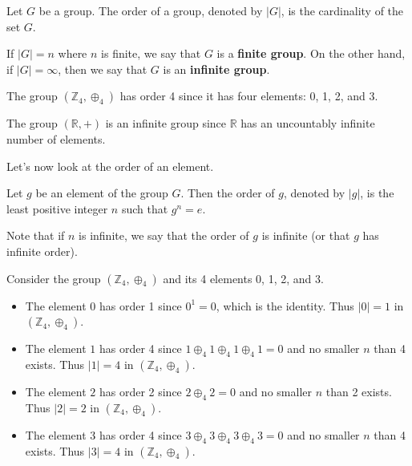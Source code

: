 \begin{definition}
    Let $G$ be a group. The order of a group, denoted by $|G|$, is the cardinality of the set $G$.
\end{definition}

If $|G| = n$ where $n$ is finite, we say that $G$ is a \textbf{finite group}. On the other hand, if $|G| = \infty$, then we say that $G$ is an \textbf{infinite group}.

\begin{example}
    The group $(\mathbb{Z}_4, \oplus_4)$ has order 4 since it has four elements: 0, 1, 2, and 3.
\end{example}

\begin{example}
    The group $(\mathbb{R}, +)$ is an infinite group since $\mathbb{R}$ has an uncountably infinite number of elements.
\end{example}

Let's now look at the order of an element.
\begin{definition}
    Let $g$ be an element of the group $G$. Then the order of $g$, denoted by $|g|$, is the least positive integer $n$ such that $g^n = e$.
\end{definition}
Note that if $n$ is infinite, we say that the order of $g$ is infinite (or that $g$ has infinite order).

\begin{example}
    Consider the group $(\mathbb{Z}_4, \oplus_4)$ and its 4 elements 0, 1, 2, and 3.
    \begin{itemize}
        \item The element $0$ has order 1 since $0^1 = 0$, which is the identity. Thus $|0| = 1$ in $(\mathbb{Z}_4, \oplus_4)$.
        \item The element $1$ has order 4 since $1 \oplus_4 1 \oplus_4 1 \oplus_4 1 = 0$ and no smaller $n$ than 4 exists. Thus $|1| = 4$ in $(\mathbb{Z}_4, \oplus_4)$.
        \item The element $2$ has order 2 since $2 \oplus_4 2 = 0$ and no smaller $n$ than 2 exists. Thus $|2| = 2$ in $(\mathbb{Z}_4, \oplus_4)$.
        \item The element $3$ has order 4 since $3 \oplus_4 3 \oplus_4 3 \oplus_4 3 = 0$ and no smaller $n$ than 4 exists. Thus $|3| = 4$ in $(\mathbb{Z}_4, \oplus_4)$.
    \end{itemize}
\end{example}

